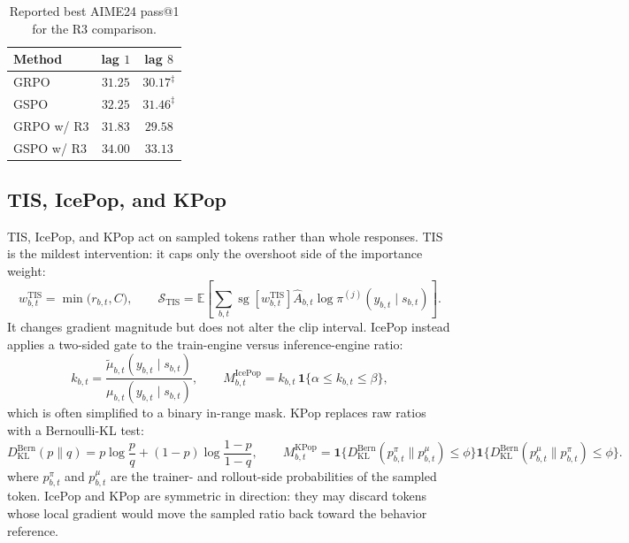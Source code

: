 \begin{table}[h]
\centering
\caption{Reported best AIME24 pass@1 for the R3 comparison.}
\label{tab:app-exp-r3}
\small
\begin{tabular}{@{}lcc@{}}
\toprule
Method & lag $1$ & lag $8$ \\
\midrule
GRPO & $31.25$ & $30.17^{\ddagger}$ \\
GSPO & $32.25$ & $31.46^{\ddagger}$ \\
GRPO w/ R3 & $31.83$ & $29.58$ \\
GSPO w/ R3 & $34.00$ & $33.13$ \\
\bottomrule
\end{tabular}
\end{table}

\subsection{TIS, IcePop, and KPop}
\label{app:token-stabilizers}

TIS, IcePop, and KPop act on sampled tokens rather than whole responses. TIS is the mildest intervention: it caps only the overshoot side of the importance weight:
\begin{equation}
w_{b,t}^{\mathrm{TIS}}=\min\bigl(r_{b,t},C\bigr),
\qquad
\mathcal S_{\mathrm{TIS}}
=\mathbb E\left[\sum_{b,t}\operatorname{sg}[w_{b,t}^{\mathrm{TIS}}]\hat A_{b,t}\log\pi^{(j)}(y_{b,t}\mid s_{b,t})\right].
\label{eq:app-tis}
\end{equation}
It changes gradient magnitude but does not alter the clip interval. IcePop instead applies a two-sided gate to the train-engine versus inference-engine ratio:
\begin{equation}
k_{b,t}=\frac{\tilde\mu_{b,t}(y_{b,t}\mid s_{b,t})}{\mu_{b,t}(y_{b,t}\mid s_{b,t})},
\qquad
M_{b,t}^{\mathrm{IcePop}}=k_{b,t}\,\mathbf 1\{\alpha\le k_{b,t}\le\beta\},
\label{eq:app-icepop}
\end{equation}
which is often simplified to a binary in-range mask. KPop replaces raw ratios with a Bernoulli-KL test:
\begin{equation}
D_{\mathrm{KL}}^{\mathrm{Bern}}(p\|q)=p\log\frac{p}{q}+(1-p)\log\frac{1-p}{1-q},
\qquad
M_{b,t}^{\mathrm{KPop}}
=\mathbf 1\bigl\{D_{\mathrm{KL}}^{\mathrm{Bern}}(p_{b,t}^{\pi}\|p_{b,t}^{\mu})\le\phi\bigr\}
\mathbf 1\bigl\{D_{\mathrm{KL}}^{\mathrm{Bern}}(p_{b,t}^{\mu}\|p_{b,t}^{\pi})\le\phi\bigr\}.
\label{eq:app-kpop}
\end{equation}
where $p_{b,t}^{\pi}$ and $p_{b,t}^{\mu}$ are the trainer- and rollout-side probabilities of the sampled token. IcePop and KPop are symmetric in direction: they may discard tokens whose local gradient would move the sampled ratio back toward the behavior reference.

